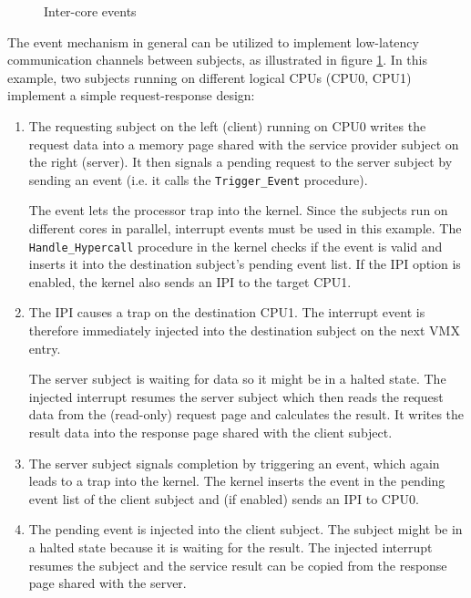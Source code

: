 \begin{figure}[h]
	\centering
	
	\caption{Inter-core events}
	\label{fig:inter-core-events}
\end{figure}

The event mechanism in general can be utilized to implement low-latency
communication channels between subjects, as illustrated in figure
\ref{fig:inter-core-events}. In this example, two subjects running on different
logical CPUs (CPU0, CPU1) implement a simple request-response design:

\begin{enumerate}
	\item The requesting subject on the left (client) running on CPU0 writes
		the request data into a memory page shared with the service provider
		subject on the right (server). It then signals a pending request to the
		server subject by sending an event (i.e. it calls the
		\texttt{Trigger\_Event} procedure).

		The event lets the processor trap into the kernel. Since the subjects
		run on different cores in parallel, interrupt events must be used in
		this example. The \texttt{Handle\_Hypercall} procedure in the kernel
		checks if the event is valid and inserts it into the destination
		subject's pending event list. If the IPI option is enabled, the kernel
		also sends an IPI to the target CPU1.
	\item The IPI causes a trap on the destination CPU1. The interrupt
		event is therefore immediately injected into the destination subject on
		the next VMX entry.

		The server subject is waiting for data so it might be in a halted
		state.  The injected interrupt resumes the server subject which then
		reads the request data from the (read-only) request page and calculates
		the result. It writes the result data into the response page shared
		with the client subject.
	\item The server subject signals completion by triggering an event, which
		again leads to a trap into the kernel. The kernel inserts the event in
		the pending event list of the client subject and (if enabled) sends an
		IPI to CPU0.
	\item The pending event is injected into the client subject. The subject
		might be in a halted state because it is waiting for the result. The
		injected interrupt resumes the subject and the service result can be
		copied from the response page shared with the server.
\end{enumerate}
